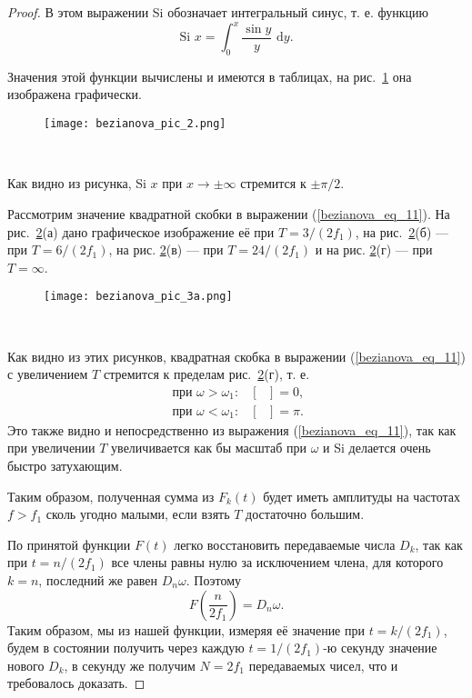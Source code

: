\begin{proof}
В этом выражении Si обозначает интегральный синус, т. е. функцию
\begin{equation}\label{bezianova_eq_12}
\text { Si } x=\int_0^x \frac{\sin y}{y} \text{ d} y \text {. }
\end{equation}

Значения этой функции вычислены и имеются в таблицах, на рис.~\ref{fig::bezianova_pic_2} она изображена графически.

\begin{figure}[H]
        \centering
        \texttt{[image: bezianova\_pic\_2.png]}
        \caption{~}
        \label{fig::bezianova_pic_2}
    \end{figure}

Как видно из рисунка, Si $x$ при $x \rightarrow \pm \infty$ стремится к $\pm \pi / 2$.

Рассмотрим значение квадратной скобки в выражении (\ref{bezianova_eq_11}). На рис.~\ref{fig::bezianova_pic_3а}(а) дано графическое изображение её при $T=3 /\left(2 f_1\right)$, на рис.~\ref{fig::bezianova_pic_3а}(б) --- при $T=6 /\left(2 f_1\right)$, на рис. \ref{fig::bezianova_pic_3а}(в) --- при $T=24 /\left(2 f_1\right)$ и на рис. \ref{fig::bezianova_pic_3а}(г) --- при $T=\infty$.

\begin{figure}[H]
        \centering
        \texttt{[image: bezianova\_pic\_3а.png]}
        \caption{~}
        \label{fig::bezianova_pic_3а}
    \end{figure}
Как видно из этих рисунков, квадратная скобка в выражении (\ref{bezianova_eq_11}) с увеличением $T$ стремится к пределам рис.~\ref{fig::bezianova_pic_3а}(г), т. е.
$$
\begin{array}{ll}
\text { при } \omega>\omega_1: & {[\text{ }]=0,} \\
\text { при } \omega<\omega_1: & {[\text{ }]=\pi .}
\end{array}
$$
\qquad Это также видно и непосредственно из выражения (\ref{bezianova_eq_11}), так как при увеличении $T$ увеличивается как бы масштаб при $\omega$ и Si делается очень быстро затухающим.

Таким образом, полученная сумма из $F_k(t)$ будет иметь амплитуды на частотах $f>f_1$ сколь угодно малыми, если взять $T$ достаточно большим.

По принятой функции $F(t)$ легко восстановить передаваемые числа $D_k$, так как при $t=n /\left(2 f_1\right)$ все члены равны нулю за исключением члена, для которого $k=n$, последний же равен $D_n \omega$. Поэтому
$$
F\left(\frac{n}{2 f_1}\right)=D_n \omega.
$$
\qquad Таким образом, мы из нашей функции, измеряя её значение при $t=k /\left(2 f_1\right)$, будем в состоянии получить через каждую $t=1 /\left(2 f_1\right)$-ю секунду значение нового $D_k$, в секунду же получим $N=2 f_1$ передаваемых чисел, что и требовалось доказать.
\end{proof}

